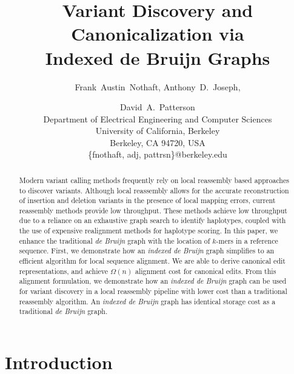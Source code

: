 \documentclass[11pt]{article}
\begin{document}
\title{Variant Discovery and Canonicalization via \\ Indexed de Bruijn Graphs}
\author{Frank~Austin~Nothaft, Anthony~D.~Joseph, \and David~A.~Patterson \\
Department of Electrical Engineering and Computer Sciences\\
University of California, Berkeley \\ 
Berkeley, CA 94720, USA \\
\{fnothaft, adj, pattrsn\}@berkeley.edu}

\maketitle              %

\begin{abstract}

Modern variant calling methods frequently rely on local reassembly based approaches to discover
variants. Although local reassembly allows for the accurate reconstruction of insertion and deletion
variants in the presence of local mapping errors, current reassembly methods provide low throughput.
These methods achieve low throughput due to a reliance on an exhaustive graph search to identify
haplotypes, coupled with the use of expensive realignment methods for haplotype scoring. In this paper,
we enhance the traditional \emph{de Bruijn} graph with the location of $k$-mers in a reference sequence.
First, we demonstrate how an \emph{indexed de Bruijn} graph simplifies to an efficient algorithm for local sequence
alignment. We are able to derive canonical edit representations, and achieve $\Omega(n)$ alignment cost
for canonical edits. From this alignment formulation, we demonstrate how an \emph{indexed de Bruijn}
graph can be used for variant discovery in a local reassembly pipeline with lower cost than a traditional
reassembly algorithm. An \emph{indexed de Bruijn} graph has identical storage cost as a traditional
\emph{de Bruijn} graph. 

\end{abstract}

\section{Introduction}
\label{sec:introduction}
\end{document}
